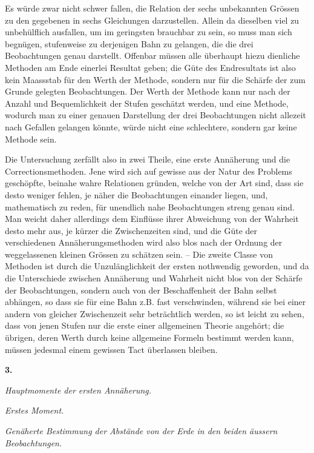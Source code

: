 \documentclass[10pt,a4paper]{article}
\begin{document}
\medskip
\noindent
Es würde zwar nicht schwer fallen, die Relation der sechs unbekannten Grössen zu den gegebenen in sechs Gleichungen darzustellen. Allein da dieselben viel zu unbehülflich ausfallen, um im geringsten brauchbar zu sein, so muss man sich begnügen, stufenweise zu derjenigen Bahn zu gelangen, die die drei Beobachtungen genau darstellt. Offenbar müssen alle überhaupt hiezu dienliche Methoden am Ende einerlei Resultat geben; die Güte des Endresultats ist also kein Maassstab für den Werth der Methode, sondern nur für die Schärfe der zum Grunde gelegten Beobachtungen. Der Werth der Methode kann nur nach der Anzahl und Bequemlichkeit der Stufen geschätzt werden, und eine Methode, wodurch man zu einer genauen Darstellung der drei Beobachtungen nicht allezeit nach Gefallen gelangen könnte, würde nicht eine schlechtere, sondern gar keine Methode sein.

Die Untersuchung zerfällt also in zwei Theile, eine erste Annäherung und die Correctionsmethoden. Jene wird sich auf gewisse aus der Natur des Problems geschöpfte, beinahe wahre Relationen gründen, welche von der Art sind, dass sie desto weniger fehlen, je näher die Beobachtungen einander liegen, und, mathematisch zu reden, für unendlich nahe Beobachtungen streng genau sind. Man weicht daher allerdings dem Einflüsse ihrer Abweichung von der Wahrheit desto mehr aus, je kürzer die Zwischenzeiten sind, und die Güte der verschiedenen Annäherungsmethoden wird also blos nach der Ordnung der weggelassenen kleinen Grössen zu schätzen sein. -- Die zweite Classe von Methoden ist durch die Unzulänglichkeit der ersten nothwendig geworden, und da die Unterschiede zwischen Annäherung und Wahrheit nicht blos von der Schärfe der Beobachtungen, sondern auch von der Beschaffenheit der Bahn selbst abhängen, so dass sie für eine Bahn z.B. fast verschwinden, während sie bei einer andern von gleicher Zwischenzeit sehr beträchtlich werden, so ist leicht zu sehen, dass von jenen Stufen nur die erste einer allgemeinen Theorie angehört; die übrigen, deren Werth durch keine allgemeine Formeln bestimmt werden kann, müssen jedesmal einem gewissen Tact überlassen bleiben.

\clearpage
\noindent
\textbf{3.}

\medskip
\noindent
\textit{Hauptmomente der ersten Annäherung.}

\medskip
\noindent
\textit{Erstes Moment.}

\medskip
\noindent
\textit{Genäherte Bestimmung der Abstände von der Erde in den beiden äussern Beobachtungen.}
\end{document}

